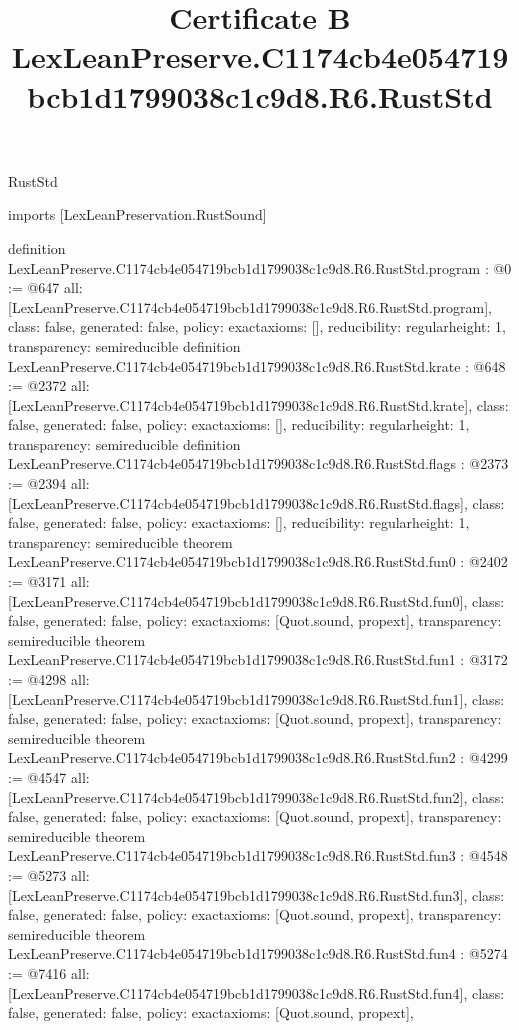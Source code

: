 \begin{lexlean}{RustStd}
\title{Certificate B LexLeanPreserve.C1174cb4e054719bcb1d1799038c1c9d8.R6.RustStd}
\begin{coremodule}
imports [LexLeanPreservation.RustSound]

definition LexLeanPreserve.C1174cb4e054719bcb1d1799038c1c9d8.R6.RustStd.program : @0 := @647 {
  all: [LexLeanPreserve.C1174cb4e054719bcb1d1799038c1c9d8.R6.RustStd.program],
  class: false,
  generated: false,
  policy: exact{axioms: []},
  reducibility: regular{height: 1},
  transparency: semireducible
}
definition LexLeanPreserve.C1174cb4e054719bcb1d1799038c1c9d8.R6.RustStd.krate : @648 := @2372 {
  all: [LexLeanPreserve.C1174cb4e054719bcb1d1799038c1c9d8.R6.RustStd.krate],
  class: false,
  generated: false,
  policy: exact{axioms: []},
  reducibility: regular{height: 1},
  transparency: semireducible
}
definition LexLeanPreserve.C1174cb4e054719bcb1d1799038c1c9d8.R6.RustStd.flags : @2373 := @2394 {
  all: [LexLeanPreserve.C1174cb4e054719bcb1d1799038c1c9d8.R6.RustStd.flags],
  class: false,
  generated: false,
  policy: exact{axioms: []},
  reducibility: regular{height: 1},
  transparency: semireducible
}
theorem LexLeanPreserve.C1174cb4e054719bcb1d1799038c1c9d8.R6.RustStd.fun0 : @2402 := @3171 {
  all: [LexLeanPreserve.C1174cb4e054719bcb1d1799038c1c9d8.R6.RustStd.fun0],
  class: false,
  generated: false,
  policy: exact{axioms: [Quot.sound, propext]},
  transparency: semireducible
}
theorem LexLeanPreserve.C1174cb4e054719bcb1d1799038c1c9d8.R6.RustStd.fun1 : @3172 := @4298 {
  all: [LexLeanPreserve.C1174cb4e054719bcb1d1799038c1c9d8.R6.RustStd.fun1],
  class: false,
  generated: false,
  policy: exact{axioms: [Quot.sound, propext]},
  transparency: semireducible
}
theorem LexLeanPreserve.C1174cb4e054719bcb1d1799038c1c9d8.R6.RustStd.fun2 : @4299 := @4547 {
  all: [LexLeanPreserve.C1174cb4e054719bcb1d1799038c1c9d8.R6.RustStd.fun2],
  class: false,
  generated: false,
  policy: exact{axioms: [Quot.sound, propext]},
  transparency: semireducible
}
theorem LexLeanPreserve.C1174cb4e054719bcb1d1799038c1c9d8.R6.RustStd.fun3 : @4548 := @5273 {
  all: [LexLeanPreserve.C1174cb4e054719bcb1d1799038c1c9d8.R6.RustStd.fun3],
  class: false,
  generated: false,
  policy: exact{axioms: [Quot.sound, propext]},
  transparency: semireducible
}
theorem LexLeanPreserve.C1174cb4e054719bcb1d1799038c1c9d8.R6.RustStd.fun4 : @5274 := @7416 {
  all: [LexLeanPreserve.C1174cb4e054719bcb1d1799038c1c9d8.R6.RustStd.fun4],
  class: false,
  generated: false,
  policy: exact{axioms: [Quot.sound, propext]},
}
\end{coremodule}
\end{lexlean}
